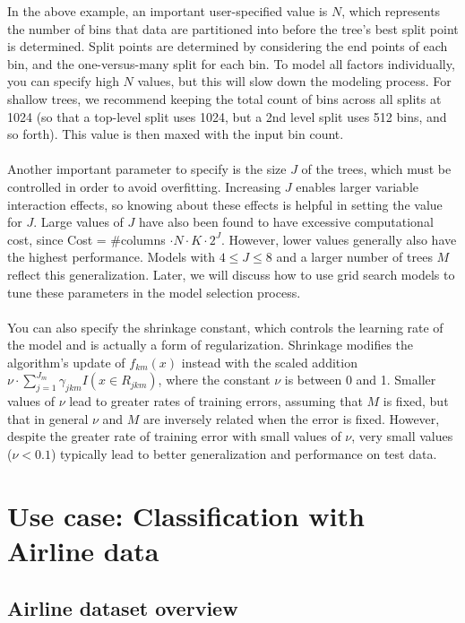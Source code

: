 \documentclass[11pt]{article}
\begin{document}
{In the above example, an important user-specified value is $N$, which represents the number of bins that data are partitioned into before the tree's best split point is determined. Split points are determined by considering the end points of each bin, and the one-versus-many split for each bin. To model all factors individually, you can specify high $N$ values, but this will slow down the modeling process. For shallow trees, we recommend keeping the total count of bins across all splits at 1024 (so that a top-level split uses 1024, but a 2nd level split uses 512 bins, and so forth). This value is then maxed with the input bin count.
\\
\\
Another important parameter to specify is the size $J$ of the trees, which must be controlled in order to avoid overfitting. Increasing $J$ enables larger variable interaction effects, so knowing about these effects is helpful in setting the value for $J$. Large values of $J$ have also been found to have excessive computational cost, since Cost = \#columns $\cdot N \cdot K \cdot 2^{J}$. However, lower values generally also have the highest performance. Models with $4 \leq J \leq 8$ and a larger number of trees $M$ reflect this generalization. Later, we will discuss how to use grid search models to tune these parameters in the model selection process.
\\
\\
You can also specify the shrinkage constant, which controls the learning rate of the model and is actually a form of regularization. Shrinkage modifies the algorithm's update of $f_{km}(x)$ instead with the scaled addition $\nu \cdot \sum_{j=1}^{J_m} \gamma_{jkm} I(x \in R_{jkm})$, where the constant $\nu$ is between 0 and 1. Smaller values of $\nu$ lead to greater rates of training errors, assuming that $M$ is fixed, but that in general $\nu$ and $M$ are inversely related when the error is  fixed.
However, despite the greater rate of training error with small values of $\nu$, very small values ($\nu < 0.1$) typically lead to better generalization and performance on test data. 

\section{Use case: Classification with Airline data} 


\subsection{Airline dataset overview} 

}
\end{document}
